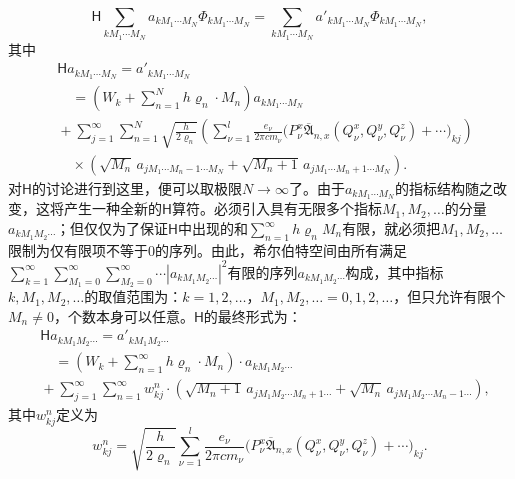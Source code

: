 \documentclass[fontsize=13pt,twoside,openany,headings=normal,parskip=false,bookmarkpackage=false,DIV=calc]{scrbook}
\begin{document}
\[
 \mathsf{H}\sum_{kM_1\cdots M_N}a_{kM_1\cdots M_N}\Phi_{kM_1\cdots M_N}
 =\sum_{kM_1\cdots M_N}a'_{kM_1\cdots M_N}\Phi_{kM_1\cdots M_N},
\]
其中
\begin{align*}
 &\mathsf{H}a_{kM_1\cdots M_N}=a'_{kM_1\cdots M_N}\\
 &\quad={}\left(W_k+\sum_{n=1}^{N}h\varrho_n\cdot M_n\right)a_{kM_1\cdots M_N}\\
 &{}+\sum_{j=1}^{\infty}\sum_{n=1}^{N}\sqrt{\frac h{2\varrho_n}}
 \left(\sum_{\nu=1}^{l}\frac{e_\nu}{2\pi cm_\nu}
 \bigl(P_\nu^x\overline{\mathfrak A}_{n,x}(Q_\nu^x,Q_\nu^y,Q_\nu^z)+\cdots\bigr)_{kj}\right)\\
 &\quad{}\times\left(\sqrt{M_n}\,a_{jM_1\cdots M_n-1\cdots M_N}
 +\sqrt{M_n+1}\,a_{jM_1\cdots M_n+1\cdots M_N}\right).
\end{align*}
对$\mathsf{H}$的讨论进行到这里，便可以取极限$N\longrightarrow\infty$了。由于$a_{kM_1\cdots M_N}$的指标结构随之改变，这将产生一种全新的$\mathsf{H}$算符。必须引入具有无限多个指标$M_1,\allowbreak M_2,\allowbreak \ldots$的分量$a_{kM_1M_2\cdots}$；但仅仅为了保证$\mathsf{H}$中出现的和$\sum_{n=1}^{\infty}h\varrho_n M_n$有限，\hypertarget{origpage-144}{}\label{origpage-144}就必须把$M_1,\allowbreak M_2,\allowbreak \ldots$限制为仅有限项不等于$0$的序列。由此，希尔伯特空间由所有满足$\sum_{k=1}^{\infty}\sum_{M_1=0}^{\infty}\sum_{M_2=0}^{\infty}\cdots|a_{kM_1M_2\cdots}|^2$有限的序列$a_{kM_1M_2\cdots}$构成，其中指标$k,\allowbreak M_1,\allowbreak M_2,\allowbreak \ldots$的取值范围为：$k=1,\allowbreak 2,\allowbreak \ldots$，$M_1,\allowbreak M_2,\allowbreak \ldots=0,\allowbreak 1,\allowbreak 2,\allowbreak \ldots$，但只允许有限个$M_n\ne0$，个数本身可以任意。$\mathsf{H}$的最终形式为：
\begin{align*}
 &\mathsf{H}a_{kM_1M_2\cdots}=a'_{kM_1M_2\cdots}\\
 &\quad={}\left(W_k+\sum_{n=1}^{\infty}h\varrho_n\cdot M_n\right)\cdot a_{kM_1M_2\cdots}\\
 &{}+\sum_{j=1}^{\infty}\sum_{n=1}^{\infty}w_{kj}^n\cdot
 \left(\sqrt{M_n+1}\,a_{jM_1M_2\cdots M_n+1\cdots}
 +\sqrt{M_n}\,a_{jM_1M_2\cdots M_n-1\cdots}\right),
\end{align*}
其中$w_{kj}^n$定义为
\[
 w_{kj}^n=\sqrt{\frac h{2\varrho_n}}\sum_{\nu=1}^{l}\frac{e_\nu}{2\pi cm_\nu}
 \bigl(P_\nu^x\overline{\mathfrak A}_{n,x}(Q_\nu^x,Q_\nu^y,Q_\nu^z)+\cdots\bigr)_{kj}.
\]
\end{document}
